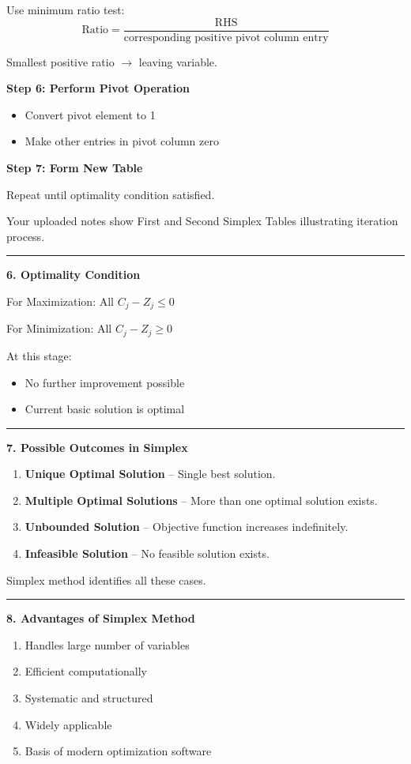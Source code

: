 \documentclass[10pt,a4paper]{article}
\newcommand{\separator}{\vspace{0.4em}\noindent\rule{\linewidth}{0.6pt}\vspace{0.4em}}
\begin{document}
Use minimum ratio test:
\[
\text{Ratio} = \frac{\text{RHS}}{\text{corresponding positive pivot column entry}}
\]

Smallest positive ratio $\rightarrow$ leaving variable.

\textbf{Step 6: Perform Pivot Operation}
\begin{itemize}
  \item Convert pivot element to 1
  \item Make other entries in pivot column zero
\end{itemize}

\textbf{Step 7: Form New Table}

Repeat until optimality condition satisfied.

Your uploaded notes show First and Second Simplex Tables illustrating iteration process.

\separator

\textbf{6. Optimality Condition}

For Maximization: All $C_j - Z_j \leq 0$

For Minimization: All $C_j - Z_j \geq 0$

At this stage:
\begin{itemize}
  \item No further improvement possible
  \item Current basic solution is optimal
\end{itemize}

\separator

\textbf{7. Possible Outcomes in Simplex}

\begin{enumerate}
  \item \textbf{Unique Optimal Solution} -- Single best solution.
  \item \textbf{Multiple Optimal Solutions} -- More than one optimal solution exists.
  \item \textbf{Unbounded Solution} -- Objective function increases indefinitely.
  \item \textbf{Infeasible Solution} -- No feasible solution exists.
\end{enumerate}

Simplex method identifies all these cases.

\separator

\textbf{8. Advantages of Simplex Method}

\begin{enumerate}
  \item Handles large number of variables
  \item Efficient computationally
  \item Systematic and structured
  \item Widely applicable
  \item Basis of modern optimization software
\end{enumerate}
\end{document}
